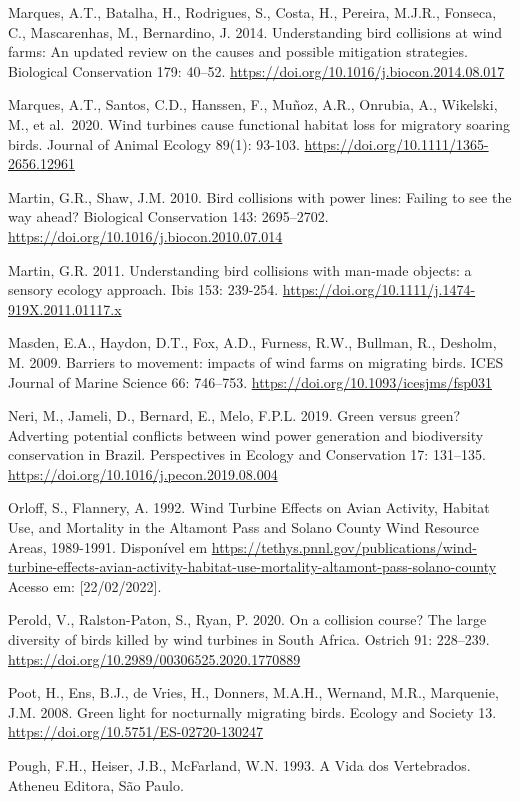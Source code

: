 \documentclass[
  oneside]{scrbook}
\begin{document}
Marques, A.T., Batalha, H., Rodrigues, S., Costa, H., Pereira, M.J.R., Fonseca, C., Mascarenhas, M., Bernardino, J. 2014. Understanding bird collisions at wind farms: An updated review on the causes and possible mitigation strategies. Biological Conservation 179: 40--52. \url{https://doi.org/10.1016/j.biocon.2014.08.017}

Marques, A.T., Santos, C.D., Hanssen, F., Muñoz, A.R., Onrubia, A., Wikelski, M., et al.~2020. Wind turbines cause functional habitat loss for migratory soaring birds. Journal of Animal Ecology 89(1): 93-103. \url{https://doi.org/10.1111/1365-2656.12961}

Martin, G.R., Shaw, J.M. 2010. Bird collisions with power lines: Failing to see the way ahead? Biological Conservation 143: 2695--2702. \url{https://doi.org/10.1016/j.biocon.2010.07.014}

Martin, G.R. 2011. Understanding bird collisions with man-made objects: a sensory ecology approach. Ibis 153: 239-254. \url{https://doi.org/10.1111/j.1474-919X.2011.01117.x}

Masden, E.A., Haydon, D.T., Fox, A.D., Furness, R.W., Bullman, R., Desholm, M. 2009. Barriers to movement: impacts of wind farms on migrating birds. ICES Journal of Marine Science 66: 746--753. \url{https://doi.org/10.1093/icesjms/fsp031}

Neri, M., Jameli, D., Bernard, E., Melo, F.P.L. 2019. Green versus green? Adverting potential conflicts between wind power generation and biodiversity conservation in Brazil. Perspectives in Ecology and Conservation 17: 131--135. \url{https://doi.org/10.1016/j.pecon.2019.08.004}

Orloff, S., Flannery, A. 1992. Wind Turbine Effects on Avian Activity, Habitat Use, and Mortality in the Altamont Pass and Solano County Wind Resource Areas, 1989-1991. Disponível em \url{https://tethys.pnnl.gov/publications/wind-turbine-effects-avian-activity-habitat-use-mortality-altamont-pass-solano-county} Acesso em: {[}22/02/2022{]}.

Perold, V., Ralston-Paton, S., Ryan, P. 2020. On a collision course? The large diversity of birds killed by wind turbines in South Africa. Ostrich 91: 228--239. \url{https://doi.org/10.2989/00306525.2020.1770889}

Poot, H., Ens, B.J., de Vries, H., Donners, M.A.H., Wernand, M.R., Marquenie, J.M. 2008. Green light for nocturnally migrating birds. Ecology and Society 13. \url{https://doi.org/10.5751/ES-02720-130247}

Pough, F.H., Heiser, J.B., McFarland, W.N. 1993. A Vida dos Vertebrados. Atheneu Editora, São Paulo.
\end{document}
